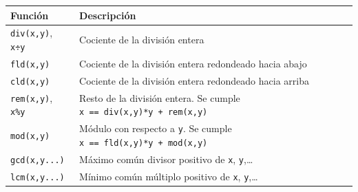 \documentclass[
  a4paper,
]{scrreport}
\theoremstyle{definition}
\theoremstyle{remark}
\begin{document}
\begin{longtable}[]{@{}
  >{\raggedright\arraybackslash}p{}
  >{\raggedright\arraybackslash}p{}@{}}
\toprule\noalign{}
\begin{minipage}[b]{\linewidth}\raggedright
Función
\end{minipage} & \begin{minipage}[b]{\linewidth}\raggedright
Descripción
\end{minipage} \\
\midrule\noalign{}
\endhead
\bottomrule\noalign{}
\endlastfoot
\texttt{div(x,y)}, \texttt{x÷y} & Cociente de la división entera \\
\texttt{fld(x,y)} & Cociente de la división entera redondeado hacia
abajo \\
\texttt{cld(x,y)} & Cociente de la división entera redondeado hacia
arriba \\
\texttt{rem(x,y)}, \texttt{x\%y} & Resto de la división entera. Se
cumple \texttt{x\ ==\ div(x,y)*y\ +\ rem(x,y)} \\
\texttt{mod(x,y)} & Módulo con respecto a \texttt{y}. Se cumple
\texttt{x\ ==\ fld(x,y)*y\ +\ mod(x,y)} \\
\texttt{gcd(x,y...)} & Máximo común divisor positivo de \texttt{x},
\texttt{y},\ldots{} \\
\texttt{lcm(x,y...)} & Mínimo común múltiplo positivo de \texttt{x},
\texttt{y},\ldots{} \\
\end{longtable}
\end{document}
